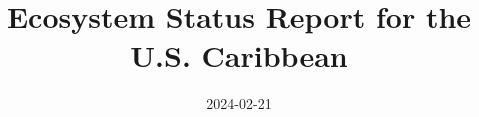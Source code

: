 \documentclass[
  letterpaper,
  oneside,
  open=any]{scrbook}
\title{Ecosystem Status Report for the U.S. Caribbean}
\author{}
\date{2024-02-21}
\begin{document}

  \begin{frontmatter}

\begin{titlepage}


\newcommand{\titlepagepagealign}{
\ifthenelse{\equal{left}{right}}{\raggedleft}{}
\ifthenelse{\equal{left}{center}}{\centering}{}
\ifthenelse{\equal{left}{left}}{\raggedright}{}
}


\newcommand{\titleandsubtitle}{
{{\large{\bfseries{\nohyphens{Ecosystem Status Report for the U.S.
Caribbean}}}}\par
}%
}
\newcommand{\titlepagetitleblock}{
\titleandsubtitle
}

\newcommand{\authorstyle}[1]{{\large{#1}}}

\newcommand{\affiliationstyle}[1]{{\large{#1}}}

\newcommand{\titlepageauthorblock}{
{\authorstyle{}}}

\newcommand{\titlepageaffiliationblock}{
\hangindent=1em
\hangafter=1
{\affiliationstyle{


\vspace{1\baselineskip} 
}}
}
\newcommand{\headerstyled}{%
{The Publisher}
}
\newcommand{\footerstyled}{%
{\large{U.S. DEPARTMENT OF COMMERCE\\
National Oceanic and Atmospheric Administration\\
National Marine Fisheries Service\\
Southeast Fisheries Science Center\\
75 Virginia Beach Drive\\
Miami, Florida 33149\\
February 2024}}
}
\newcommand{\datestyled}{%
{2024-02-21}
}


\newcommand{\titlepageheaderblock}{\headerstyled}

\newcommand{\titlepagefooterblock}{
\footerstyled
}

\newcommand{\titlepagedateblock}{
\datestyled
}

\newcommand{\titleblock}{{

{\titlepagetitleblock}
}

\vspace{4\baselineskip}
}

\newcommand{\authorblock}{}

\newcommand{\affiliationblock}{}


\end{titlepage}
\end{frontmatter}
\end{document}
